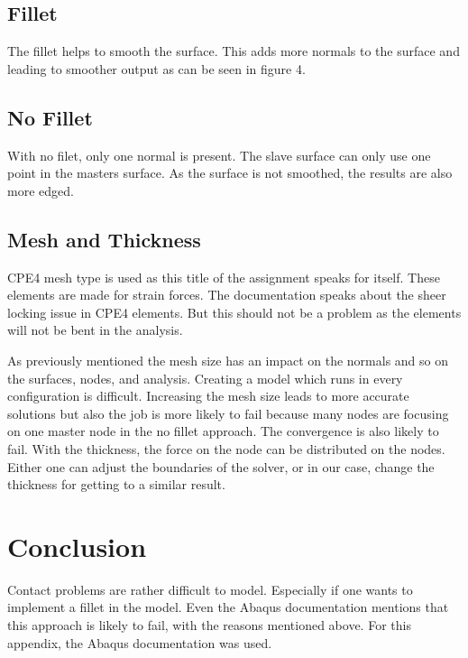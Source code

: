 \documentclass[12pt]{article}
\begin{document}
\subsection{Fillet}
The fillet helps to smooth the surface. This adds more normals to the surface and leading to smoother output as can be seen in figure 4. 
\subsection{No Fillet}
With no filet, only one normal is present. The slave surface can only use one point in the masters surface. As the surface is not smoothed, the results are also more edged.
\subsection{Mesh and Thickness}
CPE4 mesh type is used as this title of the assignment speaks for itself. These elements are made for strain forces. The documentation speaks about the sheer locking issue in CPE4 elements. But this should not be a problem as the elements will not be bent in the analysis.

As previously mentioned the mesh size has an impact on the normals and so on the surfaces, nodes, and analysis. Creating a model which runs in every configuration is difficult. Increasing the mesh size leads to more accurate solutions but also the job is more likely to fail because many nodes are focusing on one master node in the no fillet approach. The convergence is also likely to fail. With the thickness, the force on the node can be distributed on the nodes. Either one can adjust the boundaries of the solver, or in our case, change the thickness for getting to a similar result.
\section{Conclusion}
Contact problems are rather difficult to model. Especially if one wants to implement a fillet in the model. Even the Abaqus documentation mentions that this approach is likely to fail, with the reasons mentioned above. For this appendix, the Abaqus documentation was used.
\end{document}

